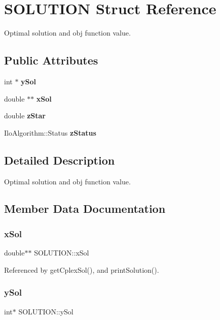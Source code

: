 \section{S\+O\+L\+U\+T\+I\+ON Struct Reference}
\label{structSOLUTION}


Optimal solution and obj function value.  


\subsection*{Public Attributes}
\begin{DoxyCompactItemize}
\item 
int $\ast$ \textbf{ y\+Sol}
\item 
double $\ast$$\ast$ \textbf{ x\+Sol}
\item 
double \textbf{ z\+Star}
\item 
Ilo\+Algorithm\+::\+Status \textbf{ z\+Status}
\end{DoxyCompactItemize}


\subsection{Detailed Description}
Optimal solution and obj function value. 

\subsection{Member Data Documentation}
\mbox{\label{structSOLUTION_a00dd4c6acc8c4855907129f0824011f4}} 
\subsubsection{x\+Sol}
{\footnotesize\ttfamily double$\ast$$\ast$ S\+O\+L\+U\+T\+I\+O\+N\+::x\+Sol}



Referenced by get\+Cplex\+Sol(), and print\+Solution().

\mbox{\label{structSOLUTION_ad5f89e3522ac2eca6d42748026f18ff2}} 
\subsubsection{y\+Sol}
{\footnotesize\ttfamily int$\ast$ S\+O\+L\+U\+T\+I\+O\+N\+::y\+Sol}



